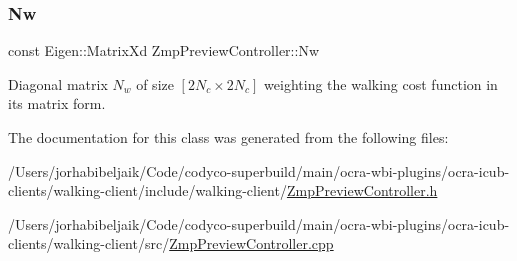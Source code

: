 \subsubsection{\texorpdfstring{Nw}{Nw}}
{\footnotesize\ttfamily const Eigen\+::\+Matrix\+Xd Zmp\+Preview\+Controller\+::\+Nw\hspace{0.3cm}{\ttfamily [private]}}

Diagonal matrix $N_w$ of size $[2N_c \times 2N_c]$ weighting the walking cost function in its matrix form. 

The documentation for this class was generated from the following files\+:\begin{DoxyCompactItemize}
\item 
/\+Users/jorhabibeljaik/\+Code/codyco-\/superbuild/main/ocra-\/wbi-\/plugins/ocra-\/icub-\/clients/walking-\/client/include/walking-\/client/\hyperlink{ZmpPreviewController_8h}{Zmp\+Preview\+Controller.\+h}\item 
/\+Users/jorhabibeljaik/\+Code/codyco-\/superbuild/main/ocra-\/wbi-\/plugins/ocra-\/icub-\/clients/walking-\/client/src/\hyperlink{ZmpPreviewController_8cpp}{Zmp\+Preview\+Controller.\+cpp}\end{DoxyCompactItemize}
